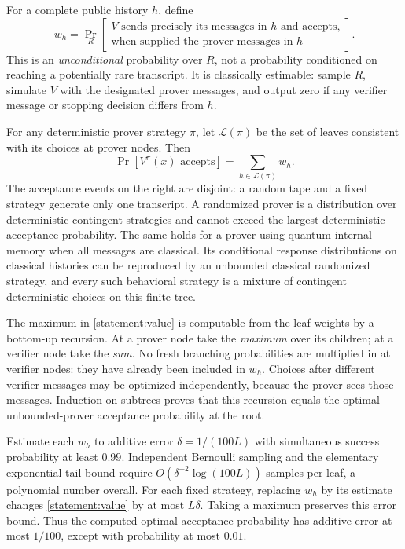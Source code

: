 \documentclass[11pt,a4paper]{article}
\numberwithin{equation}{section}
\begin{document}
For a complete public history $h$, define
\begin{equation}\label{statement:leafweight}
 w_h=\Pr_R\left[\begin{gathered}
  V\text{ sends precisely its messages in }h\text{ and accepts,}\\
  \text{when supplied the prover messages in }h
 \end{gathered}\right].
\end{equation}
This is an \emph{unconditional} probability over $R$, not a probability
conditioned on reaching a potentially rare transcript.  It is
classically estimable: sample $R$, simulate $V$ with the designated
prover messages, and output zero if any verifier message or stopping
decision differs from $h$.

For any deterministic prover strategy $\pi$, let $\mathcal L(\pi)$ be
the set of leaves consistent with its choices at prover nodes.  Then
\begin{equation}\label{statement:value}
 \Pr[V^\pi(x)\text{ accepts}]=\sum_{h\in\mathcal L(\pi)}w_h.
\end{equation}
The acceptance events on the right are disjoint: a random tape and a
fixed strategy generate only one transcript.  A randomized prover is
a distribution over deterministic contingent strategies and cannot
exceed the largest deterministic acceptance probability.  The same
holds for a prover using quantum internal memory when all messages
are classical.  Its conditional response distributions on classical
histories can be reproduced by an unbounded classical randomized
strategy, and every such behavioral strategy is a mixture of
contingent deterministic choices on this finite tree.

The maximum in \eqref{statement:value} is computable from the leaf weights by
a bottom-up recursion.  At a prover node take the \emph{maximum} over
its children; at a verifier node take the \emph{sum}.  No fresh branching
probabilities are multiplied in at verifier nodes: they have already
been included in $w_h$.  Choices after different verifier messages may
be optimized independently, because the prover sees those messages.
Induction on subtrees proves that this recursion equals the optimal
unbounded-prover acceptance probability at the root.

Estimate each $w_h$ to additive error
$\delta=1/(100L)$ with simultaneous success probability at least $0.99$.
Independent Bernoulli sampling and the elementary exponential tail
bound require $O(\delta^{-2}\log(100L))$ samples per leaf, a polynomial
number overall.  For each fixed strategy, replacing $w_h$ by its estimate
changes \eqref{statement:value} by at most $L\delta$.  Taking a maximum
preserves this error bound.  Thus the computed optimal acceptance
probability has additive error at most $1/100$, except with probability
at most $0.01$.
\end{document}
